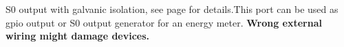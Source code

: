 S0 output with galvanic isolation, see page \pageref{fig:s0_output_application} for details.\newline This port can be used as gpio output or S0 output generator for an energy meter.\newline 
\textbf{Wrong external wiring might damage devices.}